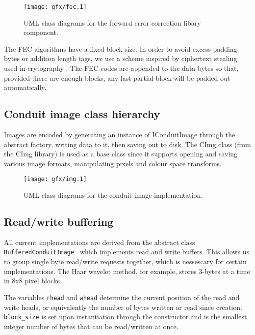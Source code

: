     \begin{figure}[tb]
        \begin{center}
                \texttt{[image: gfx/fec.1]}
            \caption{UML class diagrams for the forward error correction libary component.}
            \label{uml:fec}
        \end{center}
    \end{figure}

The FEC algorithms have a fixed block size. In order to avoid excess padding bytes or addition length tags, we use a scheme inspired by ciphertext stealing used in crytography \cite{XXX}. The FEC codes are appended to the data bytes so that, provided there are enough blocks, any last partial block will be padded out automatically.


\FloatBarrier
\subsection{Conduit image class hierarchy}

Images are encoded by generating an instance of IConduitImage through the abstract factory, writing data to it, then saving out to disk. The CImg class (from the CImg library) is used as a base class since it supports opening and saving various image formats, manipulating pixels and colour space transforms.

    \begin{figure}[tbp]
        \begin{center}
                \texttt{[image: gfx/img.1]}
            \caption{UML class diagrams for the conduit image implementation.}
            \label{uml:img-classes}
        \end{center}
    \end{figure}
    

\FloatBarrier
\subsection{Read/write buffering}

All current implementations are derived from the abstract class {\tt BufferedConduitImage } which implements read and write buffers. This allows us to group single byte read/write requests together, which is nessescary for certain implementations. The Haar wavelet method, for example, stores 3-bytes at a time in 8x8 pixel blocks.

The variables {\tt rhead} and {\tt whead} determine the current position of the read and write heads, or equivalently the number of bytes written or read since creation. {\tt block\_size} is set upon instantiation through the constructor and is the smallest integer number of bytes that can be read/written at once.

